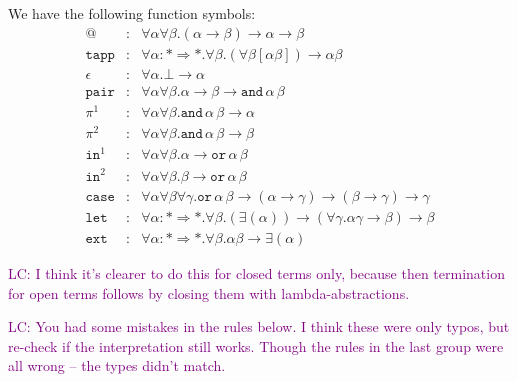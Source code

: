 \documentclass[runningheads,a4paper]{llncs}
\newcommand{\arrtype}{\rightarrow}
\newcommand{\arrkind}{\Rightarrow}
\newcommand{\LC}[1]{\textcolor{purple}{LC: #1}}
\begin{document}
We have the following function symbols:
\[
\begin{array}{rcl}
@ & : & \forall \alpha \forall \beta . (\alpha \arrtype \beta) \arrtype \alpha \arrtype \beta \\
\mathtt{tapp} & : & \forall \alpha : * \arrkind * . \forall \beta .
  (\forall \beta [\alpha \beta]) \arrtype \alpha \beta \\
\epsilon & : & \forall \alpha . \bot \arrtype \alpha \\
\mathtt{pair} & : & \forall \alpha \forall \beta . \alpha \arrtype \beta \arrtype
  \mathtt{and}\, \alpha\, \beta \\
\pi^1 & : & \forall \alpha \forall \beta . \mathtt{and}\, \alpha\, \beta \arrtype \alpha \\
\pi^2 & : & \forall \alpha \forall \beta . \mathtt{and}\, \alpha\, \beta \arrtype \beta \\
\mathtt{in}^1 & : & \forall \alpha \forall \beta . \alpha \arrtype
  \mathtt{or}\, \alpha\, \beta \\
\mathtt{in}^2 & : & \forall \alpha \forall \beta . \beta \arrtype
  \mathtt{or}\, \alpha\, \beta \\
\mathtt{case} & : & \forall \alpha \forall \beta \forall \gamma . \mathtt{or}\, \alpha\, \beta \arrtype
  (\alpha \arrtype \gamma) \arrtype (\beta \arrtype \gamma) \arrtype \gamma \\
\mathtt{let} & : & \forall \alpha : * \arrkind * . \forall \beta .
  (\exists (\alpha)) \arrtype
  (\forall \gamma . \alpha \gamma \arrtype \beta) \arrtype \beta \\
\mathtt{ext} & : & \forall \alpha : * \arrkind * . \forall \beta . \alpha \beta \arrtype
  \exists (\alpha)
\end{array}
\]

\LC{I think it's clearer to do this for closed terms only,
  because then termination for open terms follows by closing them with
  lambda-abstractions.}

\LC{You had some mistakes in the rules below. I think these were only
  typos, but re-check if the interpretation still works. Though the
  rules in the last group were all wrong -- the types didn't match.}
\end{document}
